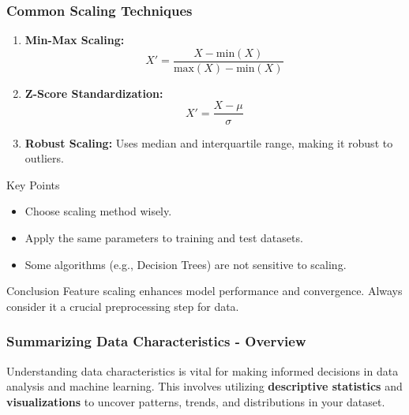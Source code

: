 \documentclass[aspectratio=169]{beamer}
\begin{document}
\begin{frame}[fragile]
    \frametitle{Common Scaling Techniques}
    \begin{enumerate}
        \item \textbf{Min-Max Scaling:}
            \begin{equation}
            X' = \frac{X - \text{min}(X)}{\text{max}(X) - \text{min}(X)}
            \end{equation}
        
        \item \textbf{Z-Score Standardization:}
            \begin{equation}
            X' = \frac{X - \mu}{\sigma}
            \end{equation}
            
        \item \textbf{Robust Scaling:} 
            Uses median and interquartile range, making it robust to outliers.
    \end{enumerate}

    \begin{block}{Key Points}
        \begin{itemize}
            \item Choose scaling method wisely.
            \item Apply the same parameters to training and test datasets.
            \item Some algorithms (e.g., Decision Trees) are not sensitive to scaling.
        \end{itemize}
    \end{block}
    
    \begin{block}{Conclusion}
        Feature scaling enhances model performance and convergence. Always consider it a crucial preprocessing step for data.
    \end{block}
\end{frame}

\begin{frame}[fragile]
    \frametitle{Summarizing Data Characteristics - Overview}
    Understanding data characteristics is vital for making informed decisions in data analysis and machine learning. This involves utilizing 
    \textbf{descriptive statistics} and \textbf{visualizations} to uncover patterns, trends, and distributions in your dataset.
\end{frame}
\end{document}
